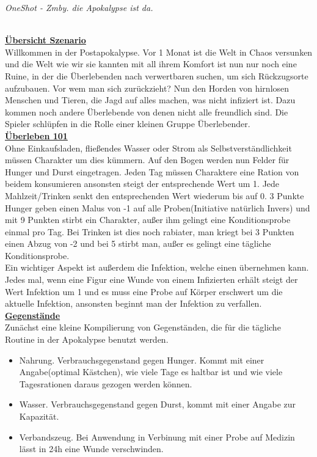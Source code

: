 \documentclass[twoside,a4paper]{minimal}
\begin{document}
\textit{OneShot - Zmby. die Apokalypse ist da.}
\setlength{\columnsep}{5pt}
\begin{multicols*}{3}
\textbf{\uline{\\Übersicht Szenario}}
\\Willkommen in der Postapokalypse. Vor 1 Monat ist die Welt in Chaos versunken und die Welt wie wir sie kannten mit all ihrem Komfort ist nun nur noch eine Ruine, in der die Überlebenden nach verwertbaren suchen, um sich Rückzugsorte aufzubauen. Vor wem man sich zurückzieht? Nun den Horden von hirnlosen Menschen und Tieren, die Jagd auf alles machen, was nicht infiziert ist. Dazu kommen noch andere Überlebende von denen nicht alle freundlich sind. Die Spieler schlüpfen in die Rolle einer kleinen Gruppe Überlebender.
\textbf{\uline{\\Überleben 101}}
\\Ohne Einkaufsladen, fließendes Wasser oder Strom als Selbstverständlichkeit müssen Charakter um dies kümmern. Auf den Bogen werden nun Felder für Hunger und Durst eingetragen. Jeden Tag müssen Charaktere eine Ration von beidem konsumieren ansonsten steigt der entsprechende Wert um 1. Jede Mahlzeit/Trinken senkt den entsprechenden Wert wiederum bis auf 0. 3 Punkte Hunger geben einen Malus von -1 auf alle Proben(Initiative natürlich Invers) und mit 9 Punkten stirbt ein Charakter, außer ihm gelingt eine Konditionsprobe einmal pro Tag. Bei Trinken ist dies noch rabiater, man kriegt bei 3 Punkten einen Abzug von -2 und bei 5 stirbt man, außer es gelingt eine tägliche Konditionsprobe.
\\Ein wichtiger Aspekt ist außerdem die Infektion, welche einen übernehmen kann. Jedes mal, wenn eine Figur eine Wunde von einem Infizierten erhält steigt der Wert Infektion um 1 und es muss eine Probe auf Körper erschwert um die aktuelle Infektion, ansonsten beginnt man der Infektion zu verfallen. 
\textbf{\uline{\\Gegenstände}}
\\Zunächst eine kleine Kompilierung von Gegenständen, die für die tägliche Routine in der Apokalypse benutzt werden.
\begin{itemize}
\item Nahrung. Verbrauchsgegenstand gegen Hunger. Kommt mit einer Angabe(optimal Kästchen), wie viele Tage es haltbar ist und wie viele Tagesrationen daraus gezogen werden können.
\item Wasser. Verbrauchsgegenstand gegen Durst, kommt mit einer Angabe zur Kapazität.
\item Verbandszeug. Bei Anwendung in Verbinung mit einer Probe auf Medizin lässt in 24h eine Wunde verschwinden.

\end{itemize}
\end{multicols*}
\end{document}
